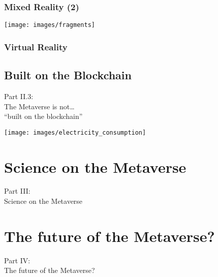 \documentclass[aspectratio=169,x11names]{beamer}
\begin{document}
\begin{frame}
\frametitle{Mixed Reality (2)}
\begin{center}
\texttt{[image: images/fragments]} 
\end{center}
\end{frame}

\begin{frame}
\frametitle{Virtual Reality}
\end{frame}


\subsection{Built on the Blockchain}

\begin{frame}
\begin{center}
\Large
Part II.3:\bigskip\\
\huge
The Metaverse is not\dots\\ ``built on the blockchain''
\end{center}
\end{frame}

\begin{frame}
\begin{center}
\texttt{[image: images/electricity\_consumption]} 
\end{center}
\end{frame}

\section{Science on the Metaverse}

\begin{frame}
\begin{center}
\Large
Part III:\bigskip\\
\huge
Science on the Metaverse
\end{center}
\end{frame}

\section{The future of the Metaverse?}

\begin{frame}
\begin{center}
\Large
Part IV:\bigskip\\
\huge
The future of the Metaverse?
\end{center}
\end{frame}
\end{document}
